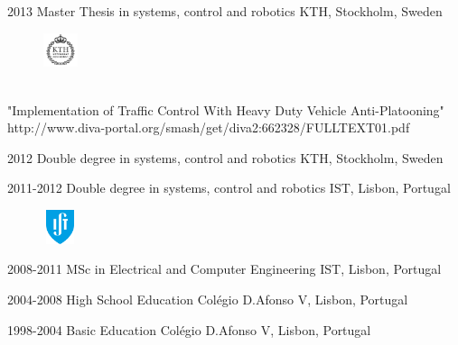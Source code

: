 \documentclass[]{friggeri-cv} %
\begin{document}
\begin{entrylist}
\entry
{2013}
{Master Thesis in systems, control and robotics}
{KTH, Stockholm, Sweden}
{
\begin{figure}
	\vspace{-20pt}
	\begin{center}
		\includegraphics[width=1cm,height=1cm]{kth}
	\end{center}
\end{figure} 
\\ 
"Implementation of Traffic Control With Heavy Duty Vehicle Anti-Platooning" 
\\
http://www.diva-portal.org/smash/get/diva2:662328/FULLTEXT01.pdf
}
\end{entrylist}
\begin{entrylist}
\entry
{2012}
{Double degree in systems, control and robotics}
{KTH, Stockholm, Sweden}
{
}
\end{entrylist}


\begin{entrylist}
\entry
{2011-2012}
{Double degree in systems, control and robotics}
{IST, Lisbon, Portugal}
{
\begin{figure}
	\vspace{-20pt}
	\begin{center}
		\includegraphics[width=1cm,height=1cm]{ist}
	\end{center}
\end{figure}
}
\end{entrylist}

\begin{entrylist}
\entry
{2008-2011}
{MSc in Electrical and Computer Engineering}
{IST, Lisbon, Portugal}
{
}
\end{entrylist}
\begin{entrylist}
\entry
{2004-2008}
{High School Education}
{Colégio D.Afonso V, Lisbon, Portugal}
{
}
\end{entrylist}
\begin{entrylist}
\entry
{1998-2004}
{Basic Education }
{Colégio D.Afonso V, Lisbon, Portugal}
{
}
\end{entrylist}
\end{document}
